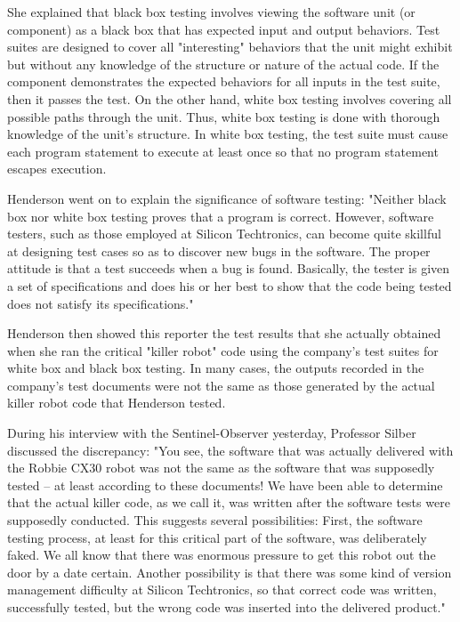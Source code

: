 She explained that black box testing involves viewing the software unit (or component) as a black box that has expected input and output behaviors. Test suites are designed to cover all "interesting" behaviors that the unit might exhibit but without any knowledge of the structure or nature of the actual code. If the component demonstrates the expected behaviors for all inputs in the test suite, then it passes the test. On the other hand, white box testing involves covering all possible paths through the unit. Thus, white box testing is done with thorough knowledge of the unit's structure. In white box testing, the test suite must cause each program statement to execute at least once so that no program statement escapes execution.

Henderson went on to explain the significance of software testing: "Neither black box nor white box testing proves that a program is correct. However, software testers, such as those employed at Silicon Techtronics, can become quite skillful at designing test cases so as to discover new bugs in the software. The proper attitude is that a test succeeds when a bug is found. Basically, the tester is given a set of specifications and does his or her best to show that the code being tested does not satisfy its specifications."

Henderson then showed this reporter the test results that she actually obtained when she ran the critical "killer robot" code using the company's test suites for white box and black box testing. In many cases, the outputs recorded in the company's test documents were not the same as those generated by the actual killer robot code that Henderson tested.

During his interview with the Sentinel-Observer yesterday, Professor Silber discussed the discrepancy: "You see, the software that was actually delivered with the Robbie CX30 robot was not the same as the software that was supposedly tested -- at least according to these documents! We have been able to determine that the actual killer code, as we call it, was written after the software tests were supposedly conducted. This suggests several possibilities: First, the software testing process, at least for this critical part of the software, was deliberately faked. We all know that there was enormous pressure to get this robot out the door by a date certain. Another possibility is that there was some kind of version management difficulty at Silicon Techtronics, so that correct code was written, successfully tested, but the wrong code was inserted into the delivered product."

